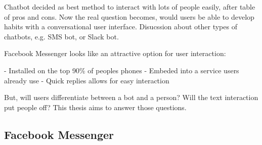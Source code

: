 




\newline
Chatbot decided as best method to interact with lots of people easily, after table of pros and cons. Now the real question becomes, would users be able to develop habits with a conversational user interface. Disucssion about other types of chatbots, e.g. SMS bot, or Slack bot.


Facebook Messenger looks like an attractive option for user interaction:

- Installed on the top 90\% of peoples phones
- Embeded into a service users already use
- Quick replies allows for easy interaction

But, will users differentiate between a bot and a person? Will the text interaction put people off? This thesis aims to answer those questions.

\subsection{Facebook Messenger}

